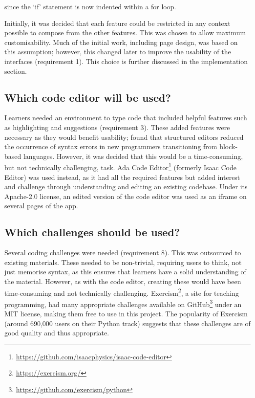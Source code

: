 since the `if' statement is now indented within a for loop.

Initially, it was decided that each feature could be restricted in any context possible to compose from the other features. This was chosen to allow maximum customisability. Much of the initial work, including page design, was based on this assumption; however, this changed later to improve the usability of the interfaces (requirement 1). This choice is further discussed in the implementation section.

\subsection{Which code editor will be used?}

Learners needed an environment to type code that included helpful features such as highlighting and suggestions (requirement 3). These added features were necessary as they would benefit usability; \citet{kazemitabaar_scaffolding_2023} found that structured editors reduced the occurrence of syntax errors in new programmers transitioning from block-based languages. However, it was decided that this would be a time-consuming, but not technically challenging, task. Ada Code Editor\footnote{\href{https://github.com/isaacphysics/isaac-code-editor}{https://github.com/isaacphysics/isaac-code-editor}} (formerly Isaac Code Editor) was used instead, as it had all the required features but added interest and challenge through understanding and editing an existing codebase. Under its Apache-2.0 license, an edited version of the code editor was used as an iframe on several pages of the app.

\subsection{Which challenges should be used?}

Several coding challenges were needed (requirement 8). This was outsourced to existing materials. These needed to be non-trivial, requiring users to think, not just memorise syntax, as this ensures that learners have a solid understanding of the material. However, as with the code editor, creating these would have been time-consuming and not technically challenging. Exercism\footnote{\href{https://exercism.org/}{https://exercism.org/}}, a site for teaching programming, had many appropriate challenges available on GitHub\footnote{\href{https://github.com/exercism/python}{https://github.com/exercism/python}} under an MIT license, making them free to use in this project. The popularity of Exercism (around 690,000 users on their Python track) suggests that these challenges are of good quality and thus appropriate.

